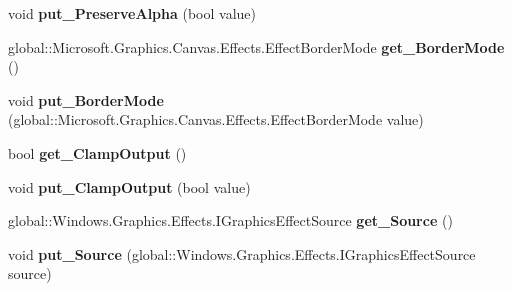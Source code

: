 \begin{DoxyCompactItemize}
\mbox{\label{class_microsoft_1_1_graphics_1_1_canvas_1_1_effects_1_1_convolve_matrix_effect_a7ff28376e85f7e4262710a6e5364f86b}} 
void {\bfseries put\+\_\+\+Preserve\+Alpha} (bool value)
\item 
\mbox{\label{class_microsoft_1_1_graphics_1_1_canvas_1_1_effects_1_1_convolve_matrix_effect_adbefe36f124d91b48f6852745d9d9481}} 
global\+::\+Microsoft.\+Graphics.\+Canvas.\+Effects.\+Effect\+Border\+Mode {\bfseries get\+\_\+\+Border\+Mode} ()
\item 
\mbox{\label{class_microsoft_1_1_graphics_1_1_canvas_1_1_effects_1_1_convolve_matrix_effect_ace47dc75de05d5c68030464a1c59cada}} 
void {\bfseries put\+\_\+\+Border\+Mode} (global\+::\+Microsoft.\+Graphics.\+Canvas.\+Effects.\+Effect\+Border\+Mode value)
\item 
\mbox{\label{class_microsoft_1_1_graphics_1_1_canvas_1_1_effects_1_1_convolve_matrix_effect_a0f7dfb640c60f46c101101863ff9ee62}} 
bool {\bfseries get\+\_\+\+Clamp\+Output} ()
\item 
\mbox{\label{class_microsoft_1_1_graphics_1_1_canvas_1_1_effects_1_1_convolve_matrix_effect_a290fd5239a39bf63799d62e94e50f048}} 
void {\bfseries put\+\_\+\+Clamp\+Output} (bool value)
\item 
\mbox{\label{class_microsoft_1_1_graphics_1_1_canvas_1_1_effects_1_1_convolve_matrix_effect_a36fb9181bea0b36c84ceb83484bd971a}} 
global\+::\+Windows.\+Graphics.\+Effects.\+I\+Graphics\+Effect\+Source {\bfseries get\+\_\+\+Source} ()
\item 
\mbox{\label{class_microsoft_1_1_graphics_1_1_canvas_1_1_effects_1_1_convolve_matrix_effect_af05f022e107a04dda7a9dc92efa0fea7}} 
void {\bfseries put\+\_\+\+Source} (global\+::\+Windows.\+Graphics.\+Effects.\+I\+Graphics\+Effect\+Source source)

\end{DoxyCompactItemize}
